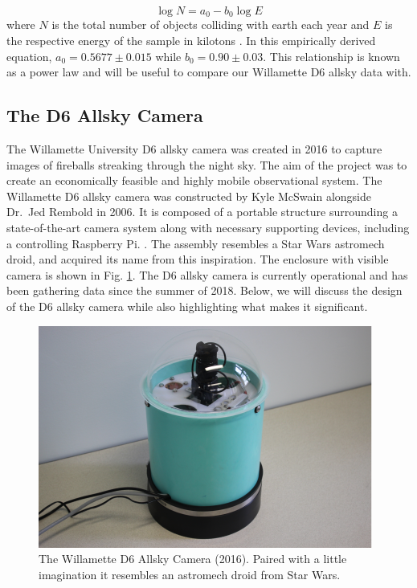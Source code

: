 \begin{equation}
\log N = a_0 - b_0\log E
\label{eq:browneq}
\end{equation}
where $N$ is the total number of objects colliding with earth each year and $E$ is the respective energy of the sample in kilotons \cite{brown_p_flux_2002}.
In this empirically derived equation, $a_0 = 0.5677 \pm 0.015$ while $b_0 = 0.90 \pm 0.03$.
This relationship is known as a power law and will be useful to compare our Willamette D6 allsky data with.




\subsection{The D6 Allsky Camera}

The Willamette University D6 allsky camera was created in 2016 to capture images of fireballs streaking through the night sky.
The aim of the project was to create an economically feasible and highly mobile observational system.
The Willamette D6 allsky camera was constructed by Kyle McSwain alongside Dr.\ Jed Rembold in 2006.
It is composed of a portable structure surrounding a state-of-the-art camera system along with necessary supporting devices, including a controlling Raspberry Pi. \cite{mcswain_using_2016}.
The assembly resembles a Star Wars astromech droid, and acquired its name from this inspiration.
The enclosure with visible camera is shown in Fig. \ref{droid}.
The D6 allsky camera is currently operational and has been gathering data since the summer of 2018.  
Below, we will discuss the design of the D6 allsky camera while also highlighting what makes it significant.

\begin{figure}[ht!]
  \centering
  \includegraphics[scale=0.7]{images/allsky_camera.png}
  \caption{The Willamette D6 Allsky Camera (2016). Paired with a little imagination it resembles an astromech droid from Star Wars.}
  \label{droid}
\end{figure}


